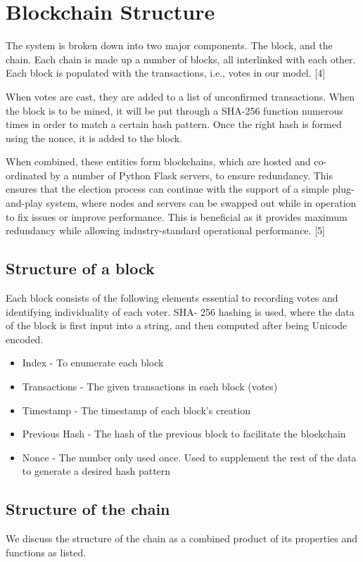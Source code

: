 \documentclass{article}
\begin{document}
    \section{Blockchain Structure}
    The system is broken down into two major components. The block, and the chain. Each chain is made up a number of blocks, all interlinked with each other. Each block is populated with the transactions, i.e., votes in our model. [4]

    When votes are cast, they are added to a list of unconfirmed transactions. When the block is to be mined, it will be put through a SHA-256 function numerous times in order to match a certain hash pattern. Once the right hash is formed using the nonce, it is added to the block.

    When combined, these entities form blockchains, which are hosted and co-ordinated by a number of Python Flask servers, to ensure redundancy. This ensures that the election process can continue with the support of a simple plug-and-play system, where nodes and servers can be swapped out while in operation to fix issues or improve performance. This is beneficial as it provides maximum redundancy while allowing industry-standard operational performance. [5]

    \subsection{Structure of a block}
    Each block consists of the following elements essential to recording votes and identifying individuality of each voter. SHA- 256 hashing is used, where the data of the block is first input into a string, and then computed after being Unicode encoded.
    \begin{itemize}
        \item Index - To enumerate each block
        \item Transactions - The given transactions in each block (votes)
        \item Timestamp - The timestamp of each block's creation
        \item Previous Hash - The hash of the previous block to facilitate the blockchain
        \item Nonce - The number only used once. Used to supplement the rest of the data to generate a desired hash pattern
    \end{itemize}
    \subsection{Structure of the chain}
    We discuss the structure of the chain as a combined product of its properties and functions as listed.
\end{document}
